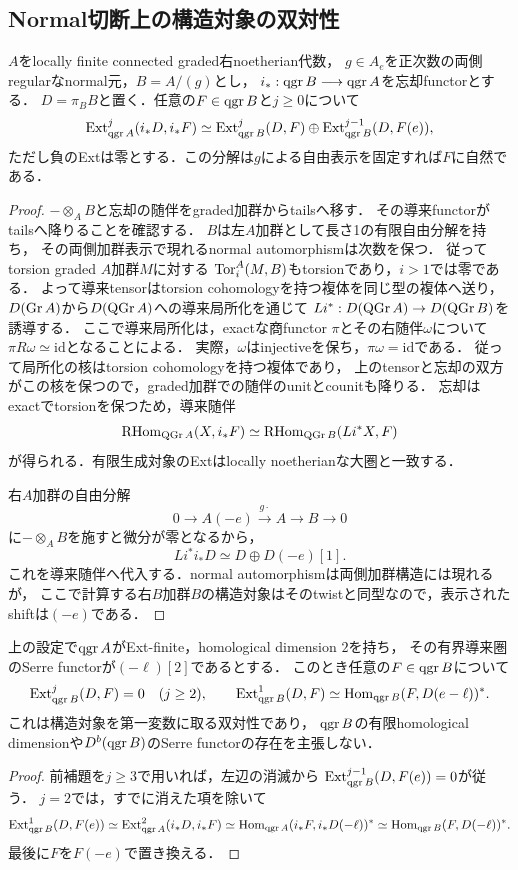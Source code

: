 \documentclass[11pt,a4paper]{ltjsarticle}
\begin{document}
\subsection{Normal切断上の構造対象の双対性}

\begin{lemma}[Normal切断の構造対象のExt]\label{lem:normal-boundary-ext}
$A$をlocally finite connected graded右noetherian代数，
$g\in A_e$を正次数の両側regularなnormal元，$B=A/(g)$とし，
$i_*:\operatorname{qgr} B\longrightarrow\operatorname{qgr} A$を忘却functorとする．
$D=\pi_BB$と置く．任意の$F\in\operatorname{qgr} B$と$j\geq0$について
\[
 \operatorname{Ext}^j_{\operatorname{qgr} A}(i_*D,i_*F)
 \simeq \operatorname{Ext}^j_{\operatorname{qgr} B}(D,F)
       \oplus \operatorname{Ext}^{j-1}_{\operatorname{qgr} B}(D,F(e)),
\]
ただし負のExtは零とする．この分解は$g$による自由表示を固定すれば$F$に自然である．
\end{lemma}
\begin{proof}
$-\otimes_A B$と忘却の随伴をgraded加群からtailsへ移す．
その導来functorがtailsへ降りることを確認する．
$B$は左$A$加群として長さ1の有限自由分解を持ち，
その両側加群表示で現れるnormal automorphismは次数を保つ．
従ってtorsion graded $A$加群$M$に対する
$\operatorname{Tor}_i^A(M,B)$もtorsionであり，$i>1$では零である．
よって導来tensorはtorsion cohomologyを持つ複体を同じ型の複体へ送り，
$D(\operatorname{Gr} A)$から$D(\operatorname{QGr} A)$への導来局所化を通じて
$Li^*:D(\operatorname{QGr} A)\to D(\operatorname{QGr} B)$を誘導する．
ここで導来局所化は，exactな商functor $\pi$とその右随伴$\omega$について
$\pi R\omega\simeq\mathrm{id}$となることによる．
実際，$\omega$はinjectiveを保ち，$\pi\omega=\mathrm{id}$である．
従って局所化の核はtorsion cohomologyを持つ複体であり，
上のtensorと忘却の双方がこの核を保つので，graded加群での随伴のunitとcounitも降りる．
忘却はexactでtorsionを保つため，導来随伴
\[
 \operatorname{RHom}_{\operatorname{QGr} A}(X,i_*F)
 \simeq \operatorname{RHom}_{\operatorname{QGr} B}(Li^*X,F)
\]
が得られる．有限生成対象のExtはlocally noetherianな大圏と一致する．

右$A$加群の自由分解
\[
 0\to A(-e)\xrightarrow{g\cdot}A\to B\to0
\]
に$-\otimes_A B$を施すと微分が零となるから，
\[
 Li^*i_*D\simeq D\oplus D(-e)[1].
\]
これを導来随伴へ代入する．normal automorphismは両側加群構造には現れるが，
ここで計算する右$B$加群$B$の構造対象はそのtwistと同型なので，表示されたshiftは$(-e)$である．
\end{proof}

\begin{proposition}[Normal境界の構造対象に対する曲線双対性]\label{prop:normal-boundary-duality}
上の設定で$\operatorname{qgr} A$がExt-finite，homological dimension $2$を持ち，
その有界導来圏のSerre functorが$(-\ell)[2]$であるとする．
このとき任意の$F\in\operatorname{qgr} B$について
\[
 \operatorname{Ext}^j_{\operatorname{qgr} B}(D,F)=0\quad(j\geq2),\qquad
 \operatorname{Ext}^1_{\operatorname{qgr} B}(D,F)
 \simeq\operatorname{Hom}_{\operatorname{qgr} B}(F,D(e-\ell))^*.
\]
これは構造対象を第一変数に取る双対性であり，
$\operatorname{qgr} B$の有限homological dimensionや$D^b(\operatorname{qgr} B)$のSerre functorの存在を主張しない．
\end{proposition}
\begin{proof}
前補題を$j\geq3$で用いれば，左辺の消滅から
$\operatorname{Ext}^{j-1}_{\operatorname{qgr} B}(D,F(e))=0$が従う．
$j=2$では，すでに消えた項を除いて
\[
 \operatorname{Ext}^1_{\operatorname{qgr} B}(D,F(e))
 \simeq \operatorname{Ext}^2_{\operatorname{qgr} A}(i_*D,i_*F)
 \simeq \operatorname{Hom}_{\operatorname{qgr} A}(i_*F,i_*D(-\ell))^*
 \simeq \operatorname{Hom}_{\operatorname{qgr} B}(F,D(-\ell))^*.
\]
最後に$F$を$F(-e)$で置き換える．
\end{proof}
\end{document}
